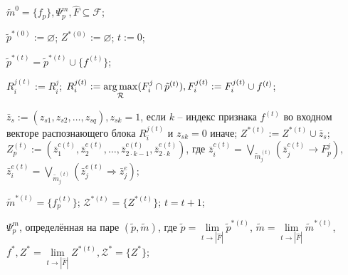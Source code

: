 	\Require $\tilde m^0=\{f_p\}, \Psi_p^m, \hat F\subseteq \mathcal F$;
	
	\State $\tilde p^{*(0)} := \varnothing$;
	\State $Z^{*(0)} := \varnothing$;
	\State $t := 0$;
	
			\State $\tilde p^{*(t)}=\tilde p^{*(t)}\cup\{f^{(t)}\}$;
	
				\State $R_i^{j(t)}:=R_i^j$;
			\Else
				\State $R_i^{j(t)}:=\operatorname*{arg\,max}\limits_{\mathcal R} (F_i^j\cap\tilde p^{(t)}), F_i^{j(t)}:=F_i^{j(t)}\cup f^{(t)}$;
			\EndIf
	
			\State $\bar z_s:=(z_{s1},z_{s2},\dots,z_{sq}), z_{sk}=1$, если $k$ -- индекс признака $f^{(t)}$ во входном векторе распознающего блока $R_i^{j(t)}$ и $z_{sk}=0$ иначе;
			\State $Z^{*(t)}:=Z^{*(t)}\cup\bar z_s$;
			\State $Z_p^{(t)}:=(\bar z_1^{c(t)},\bar z_2^{e(t)},\dots,\bar z_{2\cdot k-1}^{c(t)},\bar z_{2\cdot k}^{e(t)})$, где $\bar z_i^{c(t)}=\bigvee\limits_{\tilde m_j^{(t)}}(\bar z_j^{c(t)}\rightarrow F_p^j),$ 
	\\\hspace{3.0cm}$\bar z_i^{e(t)}=\bigvee\limits_{\tilde m_j^{(t)}}(\bar z_j^{e(t)}\Rightarrow\bar z_j^e)$;
		\EndIf
	
		\State $\tilde m^{*(t)}=\{f_p^{(t)}\}$;
		\State $\mathcal Z^{*(t)}=\{Z^{*(t)}\}$;
		\State $t=t+1$;
	\EndFor
	
	\Return $\Psi_p^m$, определённая на паре $(\tilde p, \tilde m)$, где $\tilde p=\lim\limits_{t\rightarrow|\hat F|}\tilde p^{*(t)}$, $\tilde m=\lim\limits_{t\rightarrow|\hat F|}\tilde m^{*(t)}$, $f^*, Z^*=\lim\limits_{t\rightarrow|\hat F|}Z^{*(t)},\mathcal Z^*=\{Z^*\}$;